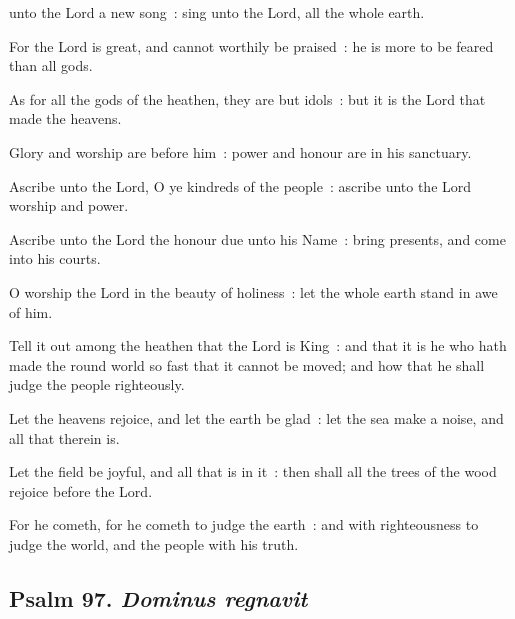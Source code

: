  unto the Lord a new song~: sing unto the Lord, all the whole earth.\par
{}
For the Lord is great, and cannot worthily be praised~: he is more to be feared than all gods.\par
{}As for all the gods of the heathen, they are but idols~: but it is the Lord that made the heavens.\par
{}Glory and worship are before him~: power and honour are in his sanctuary.\par
{}Ascribe unto the Lord, O ye kindreds of the people~: ascribe unto the Lord worship and power.\par
{}Ascribe unto the Lord the honour due unto his Name~: bring presents, and come into his courts.\par
{}O worship the Lord in the beauty of holiness~: let the whole earth stand in awe of him.\par
{}Tell it out among the heathen that the Lord is King~: and that it is he who hath made the round world so fast that it cannot be moved; and how that he shall judge the people righteously.\par
{}Let the heavens rejoice, and let the earth be glad~: let the sea make a noise, and all that therein is.\par
{}Let the field be joyful, and all that is in it~: then shall all the trees of the wood rejoice before the Lord.\par
{}For he cometh, for he cometh to judge the earth~: and with righteousness to judge the world, and the people with his truth.\par

\clearpage
\subsection{Psalm 97. \textit{Dominus regnavit}}

